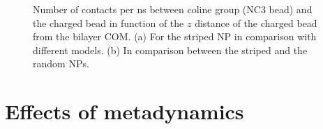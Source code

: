 \begin{figure}
	\center
	\caption{Number of contacts per ns between coline group (NC3 bead) and the charged bead in function of the $z$ distance of the charged bead from the bilayer \acs{COM}. (a) For the striped \acs{NP} in comparison with different models. (b) In comparison between the striped and the random \acs{NP}s.}
\end{figure}
\restoregeometry

\section{Effects of metadynamics}

